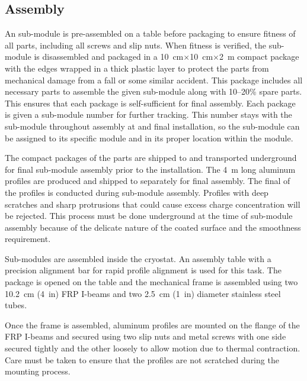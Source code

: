\subsection{Assembly}
An  sub-module is pre-assembled on a table before packaging to ensure fitness of all parts, including all screws and slip nuts.   When fitness is verified, the sub-module is disassembled and packaged in a \SI{10}{\cm}$\times$\SI{10}{\cm}$\times$\SI{2}{\m} compact package with the edges wrapped in a thick plastic layer to protect the parts from mechanical damage from a fall or some similar accident.  This package includes all necessary parts to assemble the given sub-module along with \numrange{10}{20}\% spare parts.  This ensures that each package is self-sufficient for final assembly.  Each package is given a sub-module number for further tracking.  This number stays with the sub-module throughout assembly at \surf and final installation, so the sub-module can be assigned to its specific module and in its proper location within the module. 

The compact packages of the   parts are shipped to \surf and transported underground for final sub-module assembly prior to the installation.   The \SI{4}{\m} long aluminum profiles are produced and shipped to \surf separately for final assembly.  The final  of the profiles is conducted during sub-module assembly.   Profiles with deep scratches and sharp protrusions that could cause excess charge concentration will be rejected. This process must be done underground at the time of sub-module assembly because of the delicate nature of the coated surface and the smoothness requirement. 

Sub-modules are assembled inside the  cryostat. An assembly table with a precision alignment bar for rapid profile alignment is used for this task.   The package is opened on the table and the mechanical frame is assembled using two \SI{10.2}{\cm} (\SI{4}{in}) FRP I-beams and two \SI{2.5}{\cm} (\SI{1}{in}) diameter stainless steel tubes.

Once the frame is assembled, aluminum profiles are mounted on the flange of the FRP I-beams and secured using two slip nuts and metal screws with one side secured tightly and the other loosely to allow motion due to thermal contraction.  Care must be taken to ensure that the profiles are not scratched during the mounting process. 

